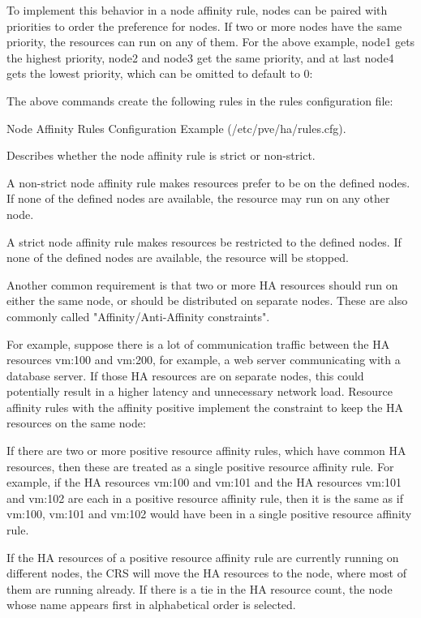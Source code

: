 To implement this behavior in a node affinity rule, nodes can be paired with priorities to order the preference for nodes. If two or more nodes have the same priority, the resources can run on any of them. For the above example, node1 gets the highest priority, node2 and node3 get the same priority, and at last node4 gets the lowest priority, which can be omitted to default to 0:

The above commands create the following rules in the rules configuration file:

Node Affinity Rules Configuration Example (/etc/pve/ha/rules.cfg).

Describes whether the node affinity rule is strict or non-strict.

A non-strict node affinity rule makes resources prefer to be on the defined nodes. If none of the defined nodes are available, the resource may run on any other node.

A strict node affinity rule makes resources be restricted to the defined nodes. If none of the defined nodes are available, the resource will be stopped.

Another common requirement is that two or more HA resources should run on either the same node, or should be distributed on separate nodes. These are also commonly called "Affinity/Anti-Affinity constraints".

For example, suppose there is a lot of communication traffic between the HA resources vm:100 and vm:200, for example, a web server communicating with a database server. If those HA resources are on separate nodes, this could potentially result in a higher latency and unnecessary network load. Resource affinity rules with the affinity positive implement the constraint to keep the HA resources on the same node:

If there are two or more positive resource affinity rules, which have common HA resources, then these are treated as a single positive resource affinity rule. For example, if the HA resources vm:100 and vm:101 and the HA resources vm:101 and vm:102 are each in a positive resource affinity rule, then it is the same as if vm:100, vm:101 and vm:102 would have been in a single positive resource affinity rule.

If the HA resources of a positive resource affinity rule are currently running on different nodes, the CRS will move the HA resources to the node, where most of them are running already. If there is a tie in the HA resource count, the node whose name appears first in alphabetical order is selected.

